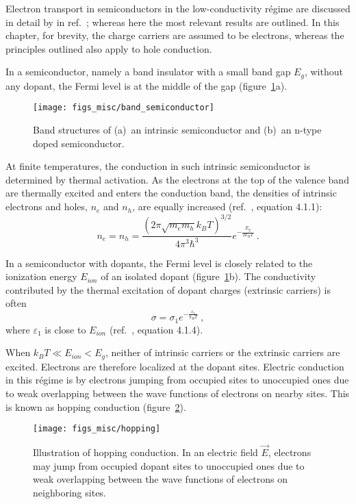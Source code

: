 Electron transport in semiconductors in the low-conductivity r\'egime are discussed in detail by \citeauthor{schklovskii_efros} in ref.~\cite{schklovskii_efros}; whereas here the most relevant results are outlined. In this chapter, for brevity, the charge carriers are assumed to be electrons, whereas the principles outlined also apply to hole conduction.

In a semiconductor, namely a band insulator with a small band gap $E_g$, without any dopant, the Fermi level is at the middle of the gap (figure~\ref{fig:band_semiconductor}a). %
\begin{figure}[ht]%
    \centering%
    \texttt{[image: figs\_misc/band\_semiconductor]}%
    \caption[Band structures of an intrinsic semiconductor and an n-type doped semiconductor]{\label{fig:band_semiconductor}Band structures of (a)~an intrinsic semiconductor and (b)~an n-type doped semiconductor.}%
\end{figure}%
%
At finite temperatures, the conduction in such intrinsic semiconductor is determined by thermal activation. As the electrons at the top of the valence band are thermally excited and enters the conduction band, the densities of intrinsic electrons and holes, $n_e$ and $n_h$, are equally increased (ref.~\cite{schklovskii_efros}, equation 4.1.1):%
\begin{equation}
    n_e = n_h = \frac{\left(2\pi\sqrt{m_e m_h}k_B T\right)^{3/2}}{4\pi^3\hbar^3}e^{-\frac{E_g}{2 k_B T}}~.
\end{equation}

In a semiconductor with dopants, the Fermi level is closely related to the ionization energy $E_{ion}$ of an isolated dopant (figure~\ref{fig:band_semiconductor}b). The conductivity contributed by the thermal excitation of dopant charges (extrinsic carriers) is often%
\begin{equation}
    \sigma = \sigma_1 e^{-\frac{\varepsilon_1}{k_B T}}~,
\end{equation}%
where $\varepsilon_1$ is close to $E_{ion}$ (ref.~\cite{schklovskii_efros}, equation 4.1.4).

When $k_B T \ll E_{ion} < E_g$, neither of intrinsic carriers or the extrinsic carriers are excited. Electrons are therefore localized at the dopant sites. Electric conduction in this r\'egime is by electrons jumping from occupied sites to unoccupied ones due to weak overlapping between the wave functions of electrons on nearby sites. This is known as hopping conduction (figure~\ref{fig:hopping}).%
\begin{figure}[ht]%
    \centering%
    \texttt{[image: figs\_misc/hopping]}%
    \caption[Illustration of hopping conduction]{\label{fig:hopping}Illustration of hopping conduction. In an electric field $\vec{E}$, electrons may jump from occupied dopant sites to unoccupied ones due to weak overlapping between the wave functions of electrons on neighboring sites.}%
\end{figure}%

